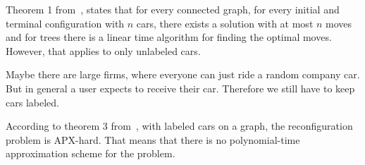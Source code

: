 Theorem 1 from~\cite{calinescu2008reconfigurations}, states that for every
connected graph, for every initial and terminal configuration with $n$ cars,
there exists a solution with at most $n$ moves and for trees there is a linear
time algorithm for finding the optimal moves. However, that applies to only
unlabeled cars.

Maybe there are large firms, where everyone can just ride a random company car.
But in general a user expects to receive their car. Therefore we still
have to keep cars labeled. 

According to theorem 3 from~\cite{calinescu2008reconfigurations}, with labeled
cars on a graph, the reconfiguration problem is APX-hard. That means that there
is no polynomial-time approximation scheme for the problem.
